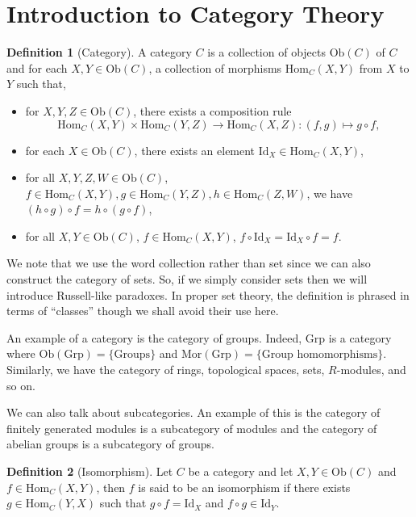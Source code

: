 \documentclass[]{article}
\theoremstyle{definition}
\theoremstyle{definition}
\newtheorem{definition}{Definition}[section]
\begin{document}
\newpage
\section{Introduction to Category Theory}

\begin{definition}[Category]
  A category \(C\) is a collection of objects \(\text{Ob}(C)\) of \(C\) and 
  for each \(X, Y \in \text{Ob}(C)\), a collection of morphisms 
  \(\text{Hom}_C(X, Y)\) from \(X\) to \(Y\) such that,
  \begin{itemize}
    \item for \(X, Y, Z \in \text{Ob}(C)\), 
    there exists a composition rule 
    \[\text{Hom}_C(X, Y) \times \text{Hom}_C(Y, Z) \to \text{Hom}_C(X, Z) : 
      (f, g) \mapsto g \circ f,\]
    \item for each \(X \in \text{Ob}(C)\), there exists an element 
    \(\text{Id}_X \in \text{Hom}_C(X, Y)\), 
    \item for all \(X, Y, Z, W \in \text{Ob}(C)\), 
    \(f \in \text{Hom}_C(X, Y), g \in \text{Hom}_C(Y, Z), h \in \text{Hom}_C(Z, W)\),
    we have \((h \circ g) \circ f = h \circ (g \circ f)\),
    \item for all \(X, Y \in \text{Ob}(C)\), \(f \in \text{Hom}_C(X, Y)\), 
    \(f \circ \text{Id}_X = \text{Id}_X \circ f = f\).
  \end{itemize}
\end{definition}

We note that we use the word collection rather than set since we can also 
construct the category of sets. So, if we simply consider sets then we will 
introduce Russell-like paradoxes. In proper set theory, the definition is phrased 
in terms of ``classes'' though we shall avoid their use here.

An example of a category is the category of groups. Indeed, \(\text{Grp}\) is a 
category where \(\text{Ob}(\text{Grp}) = \{\text{Groups}\}\) and 
\(\text{Mor}(\text{Grp}) = \{\text{Group homomorphisms}\}\). Similarly, we have 
the category of rings, topological spaces, sets, \(R\)-modules, and so on. 

We can also talk about subcategories. An example of this is the category of 
finitely generated modules is a subcategory of modules and the category of 
abelian groups is a subcategory of groups.

\begin{definition}[Isomorphism]
  Let \(C\) be a category and let \(X, Y \in \text{Ob}(C)\) and 
  \(f \in \text{Hom}_C(X, Y)\), then \(f\) is said to be an isomorphism if 
  there exists \(g \in \text{Hom}_C(Y, X)\) such that \(g \circ f = \text{Id}_X\) 
  and \(f \circ g \in \text{Id}_Y\).
\end{definition}
\end{document}
